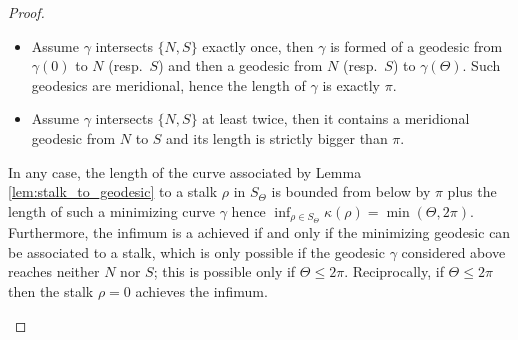 \documentclass[a4paper,12pt]{article}
\theoremstyle{definition}
\begin{document}
\begin{proof}
\begin{itemize}
\begin{itemize}
				 Otherwise, since $\phi\circ \gamma(0)=-\phi\circ \gamma(\Theta-\pi)$ up to reparameterization, $\rho(\theta)=\sinh(\alpha)\sin(\theta)$ with $\theta\in [m-\pi/2,\pi/2-m]$ and $m=\pi-\Theta/2$. Then $$\kappa(\rho) = \pi-2\arctan\left(\frac{\tan(m)}{\cosh(\alpha)}\right)$$ which is minimal if and only if $\alpha=0$ in which case the length of $\gamma$ is $\Theta-\pi$.
				
				\item Assume $\gamma$ intersects $\{N,S\}$ exactly once, then $\gamma$ is formed of a geodesic from $\gamma(0)$ to $N$ (resp.\ $S$) and then a geodesic from $N$ (resp.\ $S$) to $\gamma(\Theta)$. Such geodesics are meridional, hence the length of $\gamma$ is exactly $\pi$. 
				
				\item Assume $\gamma$ intersects $\{N,S\}$ at least twice, then it contains a meridional geodesic from $N$ to $S$ and its length is strictly bigger than $\pi$.
				\end{itemize}
				
				
								
				In any case, the length of the curve associated by Lemma \ref{lem:stalk_to_geodesic} to a stalk $\rho$ in $S_\Theta$ is bounded from below by $\pi$ plus the length of such a minimizing curve $\gamma$ hence $\inf_{\rho\in S_\Theta} \kappa(\rho)= \min(\Theta,2\pi)$. Furthermore, the infimum is a achieved if and only if the minimizing geodesic can be associated to a stalk, which is only possible if the geodesic $\gamma$ considered above reaches neither $N$ nor $S$; this is possible only if $\Theta\leq 2\pi$.  Reciprocally, if $\Theta\leq 2\pi$ then the stalk $\rho=0$ achieves the infimum.
				
        
					\end{itemize}\end{proof}
\end{document}
